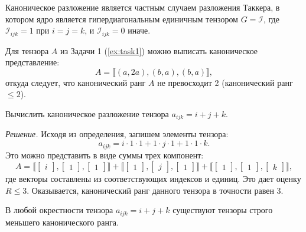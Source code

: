 \begin{tcbremark}
    Каноническое разложение является частным случаем разложения Таккера, в котором ядро является гипердиагональным единичным тензором $G = \mathcal{I}$, где $\mathcal{I}_{ijk} = 1$ при $i=j=k$, и $\mathcal{I}_{ijk} = 0$ иначе.
\end{tcbremark}

Для тензора $A$ из Задачи 1 (\cref{ex:task1}) можно выписать каноническое представление:
\[
    A = \llbracket (a, 2a), (b, a), (b, a) \rrbracket,
\]
откуда следует, что канонический ранг $A$ не превосходит 2 (канонический ранг $\leq 2$).

\begin{tcbexample}
\label{ex:task2}
    Вычислить каноническое разложение тензора $a_{ijk} = i + j + k$.
    
    \textit{Решение.} Исходя из определения, запишем элементы тензора:
    \[
        a_{ijk} = i \cdot 1 \cdot 1 + 1 \cdot j \cdot 1 + 1 \cdot 1 \cdot k.
    \]
    Это можно представить в виде суммы трех компонент:
    \[
        A = \llbracket \begin{bmatrix} i \end{bmatrix}, \begin{bmatrix} 1 \end{bmatrix}, \begin{bmatrix} 1 \end{bmatrix} \rrbracket + \llbracket \begin{bmatrix} 1 \end{bmatrix}, \begin{bmatrix} j \end{bmatrix}, \begin{bmatrix} 1 \end{bmatrix} \rrbracket + \llbracket \begin{bmatrix} 1 \end{bmatrix}, \begin{bmatrix} 1 \end{bmatrix}, \begin{bmatrix} k \end{bmatrix} \rrbracket,
    \]
    где векторы составлены из соответствующих индексов и единиц. Это дает оценку $R \leq 3$. Оказывается, канонический ранг данного тензора в точности равен 3.
\end{tcbexample}

\begin{tcbtheorem}
\label{thm:tensor-approximation}
    В любой окрестности тензора $a_{ijk} = i + j + k$ существуют тензоры строго меньшего канонического ранга.
\end{tcbtheorem}

